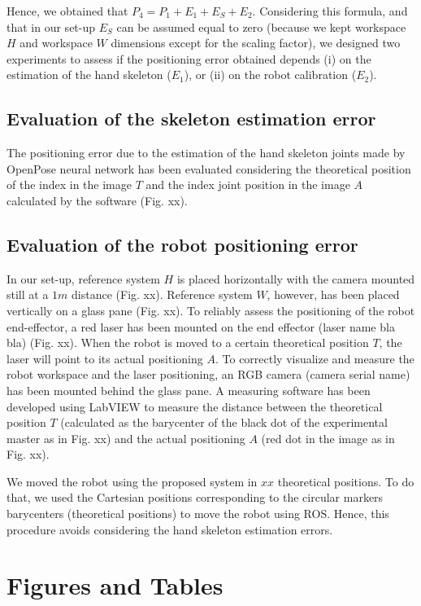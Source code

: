 \documentclass[letterpaper, 10 pt, conference]{ieeeconf}  %
\begin{document}
Hence, we obtained that $P_4 = P_1 + E_1 + E_S + E_2$.
Considering this formula, and that in our set-up $E_S$ can be assumed equal to zero (because we kept workspace $H$ and workspace $W$ dimensions except for the scaling factor), we designed two experiments to assess if the positioning error obtained depends (i) on the estimation of the hand skeleton ($E_1$), or (ii) on the robot calibration ($E_2$).

\subsection{Evaluation of the skeleton estimation error}
The positioning error due to the estimation of the hand skeleton joints made by OpenPose neural network has been evaluated considering the theoretical position of the index in the image $T$ and the index joint position in the image $A$ calculated by the software (Fig. xx).

\subsection{Evaluation of the robot positioning error}
In our set-up, reference system $H$ is placed horizontally with the camera mounted still at a $1 m$ distance (Fig. xx). Reference system $W$, however, has been placed vertically on a glass pane (Fig. xx).
To reliably assess the positioning of the robot end-effector, a red laser has been mounted on the end effector (laser name bla bla) (Fig. xx). When the robot is moved to a certain theoretical position $T$, the laser will point to its actual positioning $A$. To correctly visualize and measure the robot workspace and the laser positioning, an RGB camera (camera serial name) has been mounted behind the glass pane.
A measuring software has been developed using LabVIEW to measure the distance between the theoretical position $T$ (calculated as the barycenter of the black dot of the experimental master as in Fig. xx) and the actual positioning $A$ (red dot in the image as in Fig. xx).

We moved the robot using the proposed system in $xx$ theoretical positions. To do that, we used the Cartesian positions corresponding to the circular markers barycenters (theoretical positions) to move the robot using ROS. Hence, this procedure avoids considering the hand skeleton estimation errors.



\section{Figures and Tables}
\end{document}
